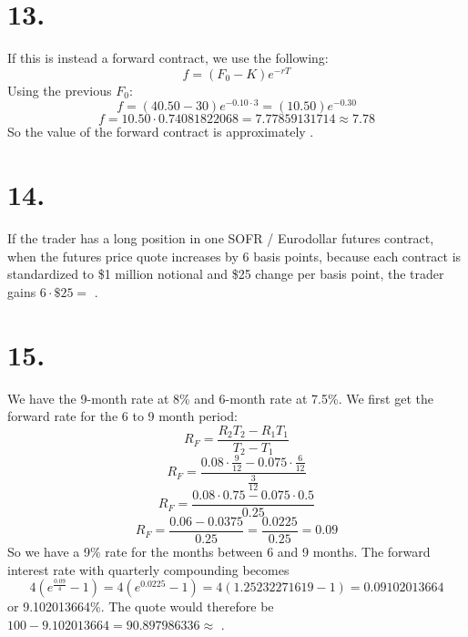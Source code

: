 \documentclass{article}
\begin{document}
{\Large 

\section*{13.}

If this is instead a forward contract, we use the following:
\[
  f = (F_0 - K)e^{-rT}
\]
Using the previous \(F_0\):
\[
  f = (40.50 - 30)e^{-0.10 \cdot 3} = (10.50)e^{-0.30} 
\]
\[
  f = 10.50 \cdot 0.74081822068 = 7.77859131714 \approx 7.78
\]
So the value of the forward contract is approximately .

}
{\Large 

\section*{14.}

If the trader has a long position in one SOFR / Eurodollar futures contract, when the futures price quote increases by 6 basis points, because each contract is standardized to \$1 million notional and \$25 change per basis point, the trader gains \(6 \cdot \$25 = \) . 

}
{\Large 

\section*{15.}

We have the 9-month rate at 8\% and 6-month rate at 7.5\%. We first get the forward rate for the 6 to 9 month period: 
\[
  R_F = \frac{R_2T_2 - R_1T_1}{T_2 - T_1}
\]
\[
  R_F = \frac{0.08 \cdot \frac{9}{12} - 0.075 \cdot \frac{6}{12}}{\frac{3}{12}}
\]
\[
  R_F = \frac{0.08 \cdot 0.75 - 0.075 \cdot 0.5}{0.25}
\]
\[
  R_F = \frac{0.06 - 0.0375}{0.25} = \frac{0.0225}{0.25} = 0.09
\]
So we have a 9\% rate for the months between 6 and 9 months. The forward interest rate with quarterly compounding becomes 
\[
  4(e^{\frac{0.09}{4}} - 1) = 4(e^{0.0225} - 1) = 4(1.25232271619 - 1) = 0.09102013664 
\]
or 9.102013664\%. The quote would therefore be \(100 - 9.102013664 = 90.897986336 \approx\) .

}
\end{document}
